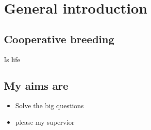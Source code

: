 








\chapter{General introduction}


\section*{Cooperative breeding}

Is life

\newpage

\section*{My aims are}

\begin{itemize}
 \item Solve the big questions
 \item please my supervior
\end{itemize}


\newpage

